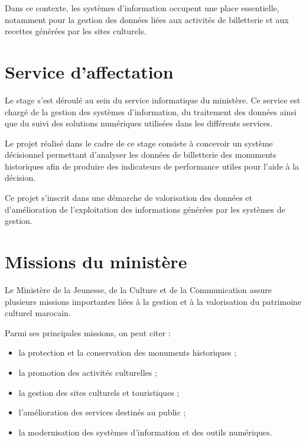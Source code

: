 \documentclass[12pt,a4paper]{report}
\begin{document}
Dans ce contexte, les systèmes d’information occupent une place essentielle, notamment pour la gestion des données liées aux activités de billetterie et aux recettes générées par les sites culturels.


\section{Service d’affectation}

Le stage s’est déroulé au sein du service informatique du ministère. Ce service est chargé de la gestion des systèmes d’information, du traitement des données ainsi que du suivi des solutions numériques utilisées dans les différents services.

Le projet réalisé dans le cadre de ce stage consiste à concevoir un système décisionnel permettant d’analyser les données de billetterie des monuments historiques afin de produire des indicateurs de performance utiles pour l’aide à la décision.

Ce projet s’inscrit dans une démarche de valorisation des données et d’amélioration de l’exploitation des informations générées par les systèmes de gestion.


\section{Missions du ministère}

Le Ministère de la Jeunesse, de la Culture et de la Communication assure plusieurs missions importantes liées à la gestion et à la valorisation du patrimoine culturel marocain.

Parmi ses principales missions, on peut citer :

\begin{itemize}
	\item la protection et la conservation des monuments historiques ;
	\item la promotion des activités culturelles ;
	\item la gestion des sites culturels et touristiques ;
	\item l’amélioration des services destinés au public ;
	\item la modernisation des systèmes d’information et des outils numériques.
\end{itemize}
\end{document}
